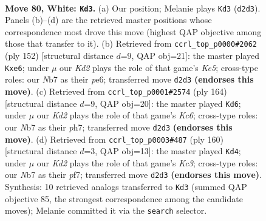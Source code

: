 \documentclass[11pt]{article}
\begin{document}
\clearpage

\begin{figure}[p]\centering
\begin{subfigure}{0.46\textwidth}\centering
\resizebox{\linewidth}{!}{%
\newchessgame
\chessboard[
  setfen={7k/1NP5/2r5/8/8/6B1/3K4/8 w - - 73 80},
  showmover=false,
  pgfstyle=straightmove, color=movearrow, markmove={d2-d3}
]}
\caption{}
\end{subfigure}\hfill
\begin{subfigure}{0.46\textwidth}\centering
\resizebox{\linewidth}{!}{%
\newchessgame
\chessboard[
  setfen={r7/P7/4p3/4K3/2k5/8/5B2/8 w - - 1 77},
  showmover=false,
  pgfstyle=straightmove, color=movearrow, markmove={e5-e6}
]}
\caption{}
\end{subfigure}
\\[4pt]
\begin{subfigure}{0.46\textwidth}\centering
\resizebox{\linewidth}{!}{%
\newchessgame
\chessboard[
  setfen={8/6Bp/2K4P/7r/4k3/8/8/8 w - - 25 83},
  showmover=false,
  pgfstyle=straightmove, color=movearrow, markmove={c6-d6}
]}
\caption{}
\end{subfigure}\hfill
\begin{subfigure}{0.46\textwidth}\centering
\resizebox{\linewidth}{!}{%
\newchessgame
\chessboard[
  setfen={8/1P3p2/3k4/1r6/4B3/2K5/8/8 w - - 35 81},
  showmover=false,
  pgfstyle=straightmove, color=movearrow, markmove={c3-d4}
]}
\caption{}
\end{subfigure}
\caption{\textbf{Move 80, White: \texttt{Kd3}.} (a) Our position; Melanie plays \texttt{Kd3} (\texttt{d2d3}). Panels (b)--(d) are the retrieved master positions whose correspondence most drove this move (highest QAP objective among those that transfer to it). (b) Retrieved from \texttt{ccrl\_top\_p0000\#2062} (ply 152) [structural distance $d$=9, QAP obj=21]: the master played \texttt{Kxe6}; under $\mu$ our \emph{Kd2} plays the role of that game's \emph{Ke5}; cross-type roles: our \emph{N}b7 as their \emph{p}e6; transferred move \texttt{d2d3} \textbf{(endorses this move)}. (c) Retrieved from \texttt{ccrl\_top\_p0001\#2574} (ply 164) [structural distance $d$=9, QAP obj=20]: the master played \texttt{Kd6}; under $\mu$ our \emph{Kd2} plays the role of that game's \emph{Kc6}; cross-type roles: our \emph{N}b7 as their \emph{p}h7; transferred move \texttt{d2d3} \textbf{(endorses this move)}. (d) Retrieved from \texttt{ccrl\_top\_p0003\#487} (ply 160) [structural distance $d$=3, QAP obj=13]: the master played \texttt{Kd4}; under $\mu$ our \emph{Kd2} plays the role of that game's \emph{Kc3}; cross-type roles: our \emph{N}b7 as their \emph{p}f7; transferred move \texttt{d2d3} \textbf{(endorses this move)}. Synthesis: 10 retrieved analogs transferred to \texttt{Kd3} (summed QAP objective 85, the strongest correspondence among the candidate moves); Melanie committed it via the \texttt{search} selector.}
\label{fig:thought-m158}
\end{figure}
\end{document}
